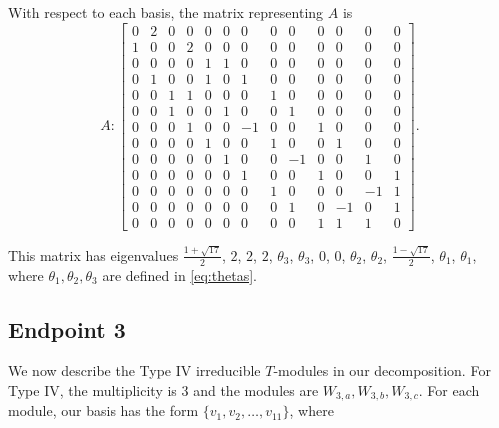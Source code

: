 \documentclass[12pt,letterpaper]{article}
\begin{document}
With respect to each basis, the matrix representing $A$ is 
\begin{equation}
    A: \begin{bmatrix}
  0 & 2 & 0 & 0 & 0 & 0 & 0 & 0 & 0 & 0 & 0 & 0 & 0 \\
  1 & 0 & 0 & 2 & 0 & 0 & 0 & 0 & 0 & 0 & 0 & 0 & 0 \\
  0 & 0 & 0 & 0 & 1 & 1 & 0 & 0 & 0 & 0 & 0 & 0 & 0 \\
  0 & 1 & 0 & 0 & 1 & 0 & 1 & 0 & 0 & 0 & 0 & 0 & 0 \\
  0 & 0 & 1 & 1 & 0 & 0 & 0 & 1 & 0 & 0 & 0 & 0 & 0 \\
  0 & 0 & 1 & 0 & 0 & 1 & 0 & 0 & 1 & 0 & 0 & 0 & 0 \\
  0 & 0 & 0 & 1 & 0 & 0 & -1 & 0 & 0 & 1 & 0 & 0 & 0 \\
  0 & 0 & 0 & 0 & 1 & 0 & 0 & 1 & 0 & 0 & 1 & 0 & 0 \\
  0 & 0 & 0 & 0 & 0 & 1 & 0 & 0 & -1 & 0 & 0 & 1 & 0 \\
  0 & 0 & 0 & 0 & 0 & 0 & 1 & 0 & 0 & 1 & 0 & 0 & 1 \\
  0 & 0 & 0 & 0 & 0 & 0 & 0 & 1 & 0 & 0 & 0 & -1 & 1 \\
  0 & 0 & 0 & 0 & 0 & 0 & 0 & 0 & 1 & 0 & -1 & 0 & 1 \\
  0 & 0 & 0 & 0 & 0 & 0 & 0 & 0 & 0 & 1 & 1 & 1 & 0 \end{bmatrix}.
\label{eq:bs-III}
\end{equation}

This matrix has eigenvalues $\frac{1+\sqrt{17}}{2}$, $2$, $2$, $2$, $\theta_3$, $\theta_3$, $0$, $0$, $\theta_2$, $\theta_2$, $\frac{1-\sqrt{17}}{2}$, $\theta_1$, $\theta_1$, where $\theta_1, \theta_2, \theta_3 $ are defined in \eqref{eq:thetas}.

\subsection{Endpoint 3}

We now describe the Type IV irreducible $T$-modules in our decomposition. For Type IV, the multiplicity is 3 and the modules are $W_{3,a},W_{3,b},W_{3,c}$. For each module, our basis has the form $\{v_1, v_2, \dots, v_{11}\}$, where 
\end{document}
